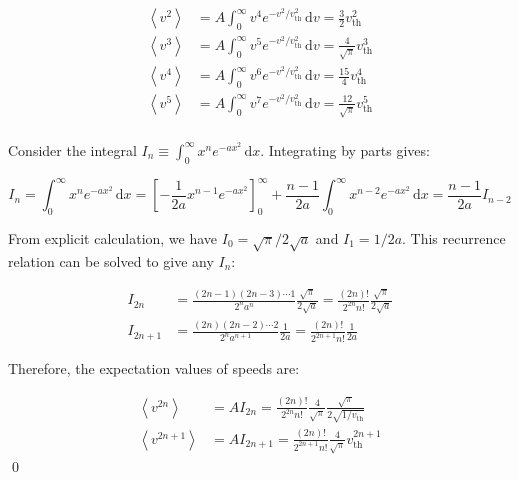 \documentclass[12pt]{article}
\begin{document}
\begin{equation}
    \begin{split}
        \left\langle v^{2} \right\rangle &= A \int_{0}^{\infty} v^{4} e^{-v^{2}/v_{\text{th}}^{2}} \, \mathrm{d}v = \frac{3}{2} v_{\text{th}}^{2} \\
        \left\langle v^{3} \right\rangle &= A \int_{0}^{\infty} v^{5} e^{-v^{2}/v_{\text{th}}^{2}} \, \mathrm{d}v = \frac{4}{\sqrt{\pi}} v_{\text{th}}^{3} \\
        \left\langle v^{4} \right\rangle &= A \int_{0}^{\infty} v^{6} e^{-v^{2}/v_{\text{th}}^{2}} \, \mathrm{d}v = \frac{15}{4} v_{\text{th}}^{4} \\
        \left\langle v^{5} \right\rangle &= A \int_{0}^{\infty} v^{7} e^{-v^{2}/v_{\text{th}}^{2}} \, \mathrm{d}v = \frac{12}{\sqrt{\pi}} v_{\text{th}}^{5} \\
    \end{split}
\end{equation}

Consider the integral $I_{n} \equiv \int_{0}^{\infty} x^{n} e^{-ax^{2}} \, \mathrm{d}x$. Integrating by parts gives:

\begin{equation}
    I_{n} = \int_{0}^{\infty} x^{n} e^{-ax^{2}} \, \mathrm{d}x = \left[ -\frac{1}{2a} x^{n-1} e^{-ax^{2}} \right]_{0}^{\infty} + \frac{n-1}{2a} \int_{0}^{\infty} x^{n-2} e^{-ax^{2}} \, \mathrm{d}x = \frac{n-1}{2a} I_{n-2}
\end{equation}

From explicit calculation, we have $I_{0} = \sqrt{\pi}/2\sqrt{a}$ and $I_{1} = 1/2a$. This recurrence relation can be solved to give any $I_{n}$:

\begin{equation}
    \begin{split}
        I_{2n} &= \frac{(2n-1)(2n-3)\cdots 1}{2^{n} a^{n}} \frac{\sqrt{\pi}}{2\sqrt{a}} = \frac{(2n)!}{2^{2n} n!} \frac{\sqrt{\pi}}{2\sqrt{a}} \\
        I_{2n+1} &= \frac{(2n)(2n-2)\cdots 2}{2^{n} a^{n+1}} \frac{1}{2a} = \frac{(2n)!}{2^{2n+1} n!} \frac{1}{2a}
    \end{split}
\end{equation}

Therefore, the expectation values of speeds are:

\begin{equation}
    \begin{split}
        \left\langle v^{2n} \right\rangle &= A I_{2n} = \frac{(2n)!}{2^{2n} n!} \frac{4}{\sqrt{\pi}} \frac{\sqrt{\pi}}{2\sqrt{1/v_{\text{th}}}} \\
        \left\langle v^{2n+1} \right\rangle &= A I_{2n+1} = \frac{(2n)!}{2^{2n+1} n!} \frac{4}{\sqrt{\pi}} v_{\text{th}}^{2n+1}
    \end{split}
\end{equation}
\qed
\end{document}

